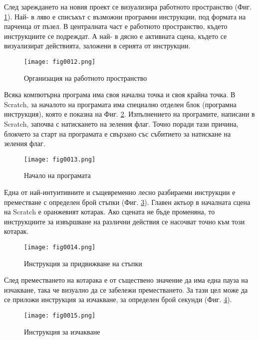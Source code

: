 След зареждането на новия проект се визуализира работното пространство (Фиг. \ref{fig0012}). Най- в ляво е списъкът с възможни програмни инструкции, под формата на парченца от пъзел. В централната част е работното пространство, където инструкциите се подреждат. А най- в дясно е активната сцена, където се визуализират действията, заложени в серията от инструкции. 

\begin{figure}[H]
  \centering
  \texttt{[image: fig0012.png]}
  \caption{Организация на работното пространство}
\label{fig0012}
\end{figure}

Всяка компютърна програма има своя начална точка и своя крайна точка. В Scratch, за началото на програмата има специално отделен блок (програмна инструкция), която е показна на Фиг. \ref{fig0013}. Изпълнението на програмите, написани в Scratch, започва с натискането на зеления флаг. Точно поради тази причина, блокчето за старт на програмата е свързано със събитието за натискане на зеления флаг. 

\begin{figure}[H]
  \centering
  \texttt{[image: fig0013.png]}
  \caption{Начало на програмата}
\label{fig0013}
\end{figure}

Една от най-интуитивните и същевременно лесно разбираеми инструкции е преместване с определен брой стъпки (Фиг. \ref{fig0014}). Главен актьор в началната сцена на Scratch е оранжевият котарак. Ако сцената не бъде променяна, то инструкциите за извършване на различни действия се насочват точно към този котарак. 

\begin{figure}[H]
  \centering
  \texttt{[image: fig0014.png]}
  \caption{Инструкция за придвижване на стъпки}
\label{fig0014}
\end{figure}

След преместването на котарака е от съществено значение да има една пауза на изчакване, така че визуално да се забележи преместването. За тази цел може да се приложи инструкция за изчакване, за определен брой секунди (Фиг. \ref{fig0015}).

\begin{figure}[H]
  \centering
  \texttt{[image: fig0015.png]}
  \caption{Инструкция за изчакване}
\label{fig0015}
\end{figure}

